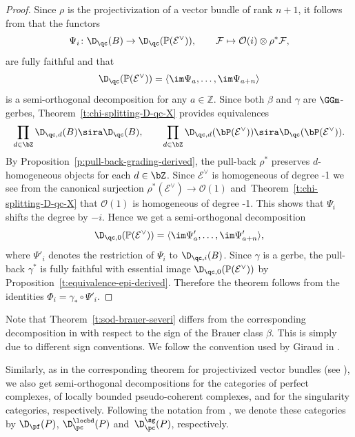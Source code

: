 \begin{proof}
Since $\rho$ is the projectivization of a vector bundle of rank $n + 1$,
it follows from \cite[Theorem~6.7]{BS-conservative} that the functors
$$
\Psi_i \colon \D_\qc(B) \to \D_{\qc}(\mathbb{P}(\mathcal{E}^\vee)), \qquad
\mathcal{F} \mapsto \mathcal{O}(i)\otimes \rho^*\mathcal{F},
$$
are fully faithful and that
$$
\D_\qc(\mathbb{P}(\mathcal{E}^\vee)) = \langle \im \Psi_{a}, \ldots,  \im \Psi_{a + n}\rangle
$$
is a semi-orthogonal decomposition for any $a \in \mathbb{Z}$.
Since both $\beta$ and $\gamma$ are $\GGm$-gerbes,
Theorem~\ref{t:chi-splitting-D-qc-X} provides equivalences
  \begin{equation*}
    \prod_{d \in \bZ} \D_{\qc, d}(B) 
    \sira 
    \D_\qc(B),
    \qquad
    \prod_{d \in \bZ} \D_{\qc, d}(\bP(\mathcal{E}^\vee)) 
    \sira
    \D_\qc(\bP(\mathcal{E}^\vee)).
  \end{equation*}
By Proposition~\ref{p:pull-back-grading-derived},
the pull-back $\rho^*$ preserves $d$-homogeneous objects for each
$d \in \bZ$.
Since $\mathcal{E}^\vee$ is homogeneous of degree -1 we see from
the canonical surjection $\rho^*(\mathcal{E}^\vee) \to
\mathcal{O}(1)$ and~Theorem~\ref{t:chi-splitting-D-qc-X} that
$\mathcal{O}(1)$ is homogeneous of degree -1. This shows that
$\Psi_i$ shifts the degree by $-i$.
Hence we get a semi-orthogonal decomposition
$$
\D_{\qc, 0}(\mathbb{P}(\mathcal{E}^\vee)) = \langle \im \Psi'_{a}, \ldots,  \im \Psi'_{a + n}\rangle,
$$
where $\Psi'_i$ denotes the restriction of $\Psi_i$ to $\D_{\qc, i}(B)$.
Since $\gamma$ is a gerbe, the pull-back $\gamma^*$ is fully faithful with essential image
$\D_{\qc, 0}(\mathbb{P}(\mathcal{E}^\vee))$ by
Proposition~\ref{t:equivalence-epi-derived}.
Therefore the theorem follows from the identities $\Phi_i = \gamma_*\circ\Psi'_i$.
\end{proof}

\begin{remark}
Note that Theorem~\ref{t:sod-brauer-severi} differs from the corresponding decomposition
in \cite[Theorem~4.1]{bernardara-BS-schemes} with respect to the sign of the Brauer class $\beta$.
This is simply due to different sign conventions.
We follow the convention used by Giraud in \cite[Example~V.4.8]{giraud1971}.
\end{remark}

Similarly, as in the corresponding theorem for projectivized vector bundles
(see \cite[Theorem~6.7, Corollary~6.8]{BS-conservative}),
we also get semi-orthogonal decompositions for the categories of
perfect complexes, of
locally bounded pseudo-coherent complexes, and for the singularity categories, respectively.
Following the notation from \cite[Section~2.3]{BS-conservative},
we denote these categories by $\D_\pf(P)$, $\D^\locbd_\pc(P)$ and~$\D^\sg_\pc(P)$,
respectively.

